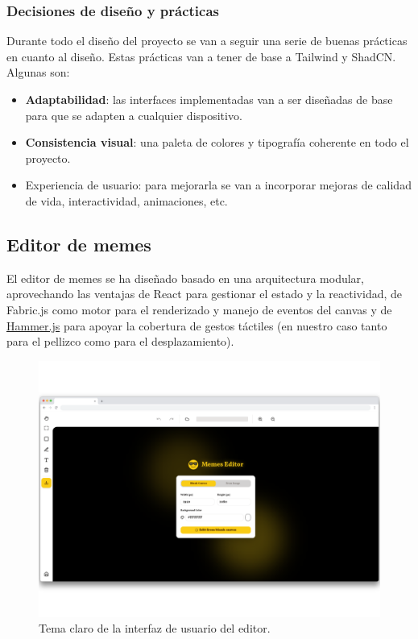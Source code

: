 \subsubsection{Decisiones de diseño y prácticas}

Durante todo el diseño del proyecto se van a seguir una serie de buenas prácticas en cuanto al diseño. Estas prácticas van a tener de base a Tailwind y ShadCN. Algunas son:

\begin{itemize}
    \item \textbf{Adaptabilidad}: las interfaces implementadas van a ser diseñadas de base para que se adapten a cualquier dispositivo.
    \item \textbf{Consistencia visual}: una paleta de colores y tipografía coherente en todo el proyecto.
    \item Experiencia de usuario: para mejorarla se van a incorporar mejoras de calidad de vida, interactividad, animaciones, etc.
\end{itemize}

\subsection{Editor de memes}

El editor de memes se ha diseñado basado en una arquitectura modular, aprovechando las ventajas de React para gestionar el estado y la reactividad, de Fabric.js como motor para el renderizado y manejo de eventos del canvas y de \href{https://hammerjs.github.io/}{Hammer.js} para apoyar la cobertura de gestos táctiles (en nuestro caso tanto para el pellizco como para el desplazamiento).

\begin{figure}[H]
    \caption{Tema claro de la interfaz de usuario del editor.}
    \centering
    \includegraphics[scale=0.11]{figuras/editor_tema_claro.png}
\end{figure}

